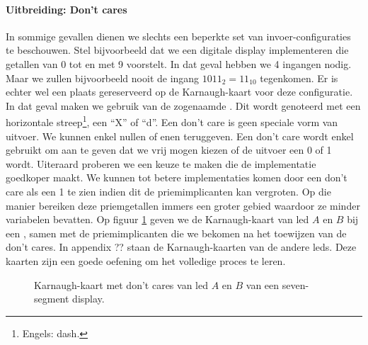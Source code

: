 \paragraph{Uitbreiding: Don't cares}
\label{par:dontcare}
In sommige gevallen dienen we slechts een beperkte set van invoer-configuraties te beschouwen. Stel bijvoorbeeld dat we een digitale display implementeren die getallen van 0 tot en met 9 voorstelt. In dat geval hebben we 4 ingangen nodig. Maar we zullen bijvoorbeeld nooit de ingang $1011_2=11_{10}$ tegenkomen. Er is echter wel een plaats gereserveerd op de Karnaugh-kaart voor deze configuratie. In dat geval maken we gebruik van de zogenaamde . Dit wordt genoteerd met een horizontale streep\footnote{Engels: dash.}, een ``X'' of ``d''. Een don't care is geen speciale vorm van uitvoer. We kunnen enkel nullen of enen teruggeven. Een don't care wordt enkel gebruikt om aan te geven dat we vrij mogen kiezen of de uitvoer een 0 of 1 wordt. Uiteraard proberen we een keuze te maken die de implementatie goedkoper maakt. We kunnen tot betere implementaties komen door een don't care als een 1 te zien indien dit de priemimplicanten kan vergroten. Op die manier bereiken deze priemgetallen immers een groter gebied waardoor ze minder variabelen bevatten. Op figuur \ref{fig:sevenDigitDisplay} geven we de Karnaugh-kaart van led $A$ en $B$ bij een , samen met de priemimplicanten die we bekomen na het toewijzen van de don't cares. In appendix ?? staan de Karnaugh-kaarten van de andere leds. Deze kaarten zijn een goede oefening om het volledige proces te leren.
\begin{figure}[hbt]
\centering
{}
\caption{Karnaugh-kaart met don't cares van led $A$ en $B$ van een seven-segment display.}
\label{fig:sevenDigitDisplay}
\end{figure}
